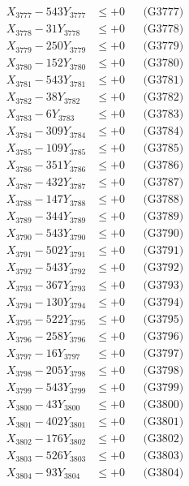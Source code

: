 \documentclass[a4paper,10pt]{article}
\begin{document}
{\begin{align}
X_{3777} - 543Y_{3777} &\leq +0 && \text{(G3777)} \\
X_{3778} - 31Y_{3778} &\leq +0 && \text{(G3778)} \\
X_{3779} - 250Y_{3779} &\leq +0 && \text{(G3779)} \\
X_{3780} - 152Y_{3780} &\leq +0 && \text{(G3780)} \\
\allowbreak
X_{3781} - 543Y_{3781} &\leq +0 && \text{(G3781)} \\
X_{3782} - 38Y_{3782} &\leq +0 && \text{(G3782)} \\
X_{3783} - 6Y_{3783} &\leq +0 && \text{(G3783)} \\
X_{3784} - 309Y_{3784} &\leq +0 && \text{(G3784)} \\
X_{3785} - 109Y_{3785} &\leq +0 && \text{(G3785)} \\
X_{3786} - 351Y_{3786} &\leq +0 && \text{(G3786)} \\
X_{3787} - 432Y_{3787} &\leq +0 && \text{(G3787)} \\
X_{3788} - 147Y_{3788} &\leq +0 && \text{(G3788)} \\
X_{3789} - 344Y_{3789} &\leq +0 && \text{(G3789)} \\
X_{3790} - 543Y_{3790} &\leq +0 && \text{(G3790)} \\
\allowbreak
X_{3791} - 502Y_{3791} &\leq +0 && \text{(G3791)} \\
X_{3792} - 543Y_{3792} &\leq +0 && \text{(G3792)} \\
X_{3793} - 367Y_{3793} &\leq +0 && \text{(G3793)} \\
X_{3794} - 130Y_{3794} &\leq +0 && \text{(G3794)} \\
X_{3795} - 522Y_{3795} &\leq +0 && \text{(G3795)} \\
X_{3796} - 258Y_{3796} &\leq +0 && \text{(G3796)} \\
X_{3797} - 16Y_{3797} &\leq +0 && \text{(G3797)} \\
X_{3798} - 205Y_{3798} &\leq +0 && \text{(G3798)} \\
X_{3799} - 543Y_{3799} &\leq +0 && \text{(G3799)} \\
X_{3800} - 43Y_{3800} &\leq +0 && \text{(G3800)} \\
\allowbreak
X_{3801} - 402Y_{3801} &\leq +0 && \text{(G3801)} \\
X_{3802} - 176Y_{3802} &\leq +0 && \text{(G3802)} \\
X_{3803} - 526Y_{3803} &\leq +0 && \text{(G3803)} \\
X_{3804} - 93Y_{3804} &\leq +0 && \text{(G3804)} \\

\end{align}}
\end{document}
